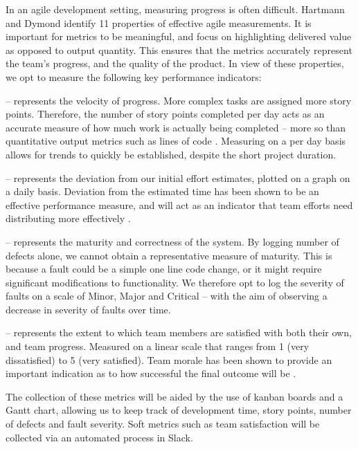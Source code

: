 In an agile development setting, measuring progress is often difficult. Hartmann and Dymond \cite{hartmann2006appropriate} identify 11 properties of effective agile measurements. It is important for metrics to be meaningful, and focus on highlighting delivered value as opposed to output quantity. This ensures that the metrics accurately represent the team's progress, and the quality of the product. In view of these properties, we opt to measure the following key performance indicators:

\begin{description}[topsep=0pt]
	\item [Story Points Completed per Day] -- represents the velocity of progress. More complex tasks are assigned more story points. Therefore, the number of story points completed per day acts as an accurate measure of how much work is actually being completed -- more so than quantitative output metrics such as lines of code \cite{davis2015agile}. Measuring on a per day basis allows for trends to quickly be established, despite the short project duration.
	\item [Estimated vs. Actual Time] -- represents the deviation from our initial effort estimates, plotted on a graph on a daily basis. Deviation from the estimated time has been shown to be an effective performance measure, and will act as an indicator that team efforts need distributing more effectively \cite{greening2015agile}.
	\item [Number and Severity of Faults per Day] -- represents the maturity and correctness of the system. By logging number of defects alone, we cannot obtain a representative measure of maturity. This is because a fault could be a simple one line code change, or it might require significant modifications to functionality. We therefore opt to log the severity of faults on a scale of Minor, Major and Critical -- with the aim of observing a decrease in severity of faults over time.
	\item [Team Satisfaction] -- represents the extent to which team members are satisfied with both their own, and team progress. Measured on a linear scale that ranges from 1 (very dissatisfied) to 5 (very satisfied). Team morale has been shown to provide an important indication as to how successful the final outcome will be \cite{prowarenessagile}.
\end{description}

The collection of these metrics will be aided by the use of kanban boards and a Gantt chart, allowing us to keep track of development time, story points, number of defects and fault severity. Soft metrics such as team satisfaction will be collected via an automated process in Slack.
